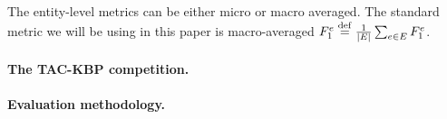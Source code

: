 The entity-level metrics can be either micro or macro averaged.
The standard metric we will be using in this paper is macro-averaged $F_1^e \stackrel{\rm def}{=} \frac{1}{|E|} \sum_{e \in E} F_1^{e}$.


\paragraph{The TAC-KBP competition.}
%

\paragraph{Evaluation methodology.}

